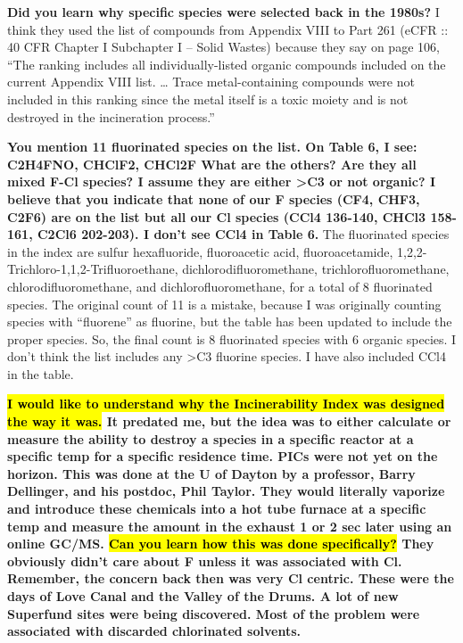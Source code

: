 \documentclass{article}
\begin{document}
\textbf{Did you learn why specific species were selected back in the 1980s?}
I think they used the list of compounds from Appendix VIII to Part 261 (eCFR :: 40 CFR Chapter I Subchapter I -- Solid Wastes) because they say on page 106, “The ranking includes all individually-listed organic compounds included on the current Appendix VIII list. … Trace metal-containing compounds were not included in this ranking since the metal itself is a toxic moiety and is not destroyed in the incineration process.”

\textbf{You mention 11 fluorinated species on the list.  On Table 6, I see: C2H4FNO, CHClF2, CHCl2F
What are the others? Are they all mixed F-Cl species?  I assume they are either >C3 or not organic?  I believe that you indicate that none of our F species (CF4, CHF3, C2F6) are on the list but all our Cl species (CCl4 136-140, CHCl3 158-161, C2Cl6 202-203).  I don’t see CCl4 in Table 6.}
The fluorinated species in the index are sulfur hexafluoride, fluoroacetic acid, fluoroacetamide, 1,2,2-Trichloro-1,1,2-Trifluoroethane, dichlorodifluoromethane, trichlorofluoromethane, chlorodifluoromethane, and dichlorofluoromethane, for a total of 8 fluorinated species. The original count of 11 is a mistake, because I was originally counting species with “fluorene” as fluorine, but the table has been updated to include the proper species. So, the final count is 8 fluorinated species with 6 organic species. I don’t think the list includes any >C3 fluorine species. I have also included CCl4 in the table.

 

\textbf{\hl{I would like to understand why the Incinerability Index was designed the way it was.}  It predated me, but the idea was to either calculate or measure the ability to destroy a species in a specific reactor at a specific temp for a specific residence time.  PICs were not yet on the horizon.  This was done at the U of Dayton by a professor, Barry Dellinger, and his postdoc, Phil Taylor.  They would literally vaporize and introduce these chemicals into a hot tube furnace at a specific temp and measure the amount in the exhaust 1 or 2 sec later using an online GC/MS.  \hl{Can you learn how this was done specifically?}  They obviously didn’t care about F unless it was associated with Cl.  Remember, the concern back then was very Cl centric.  These were the days of Love Canal and the Valley of the Drums.  A lot of new Superfund sites were being discovered.  Most of the problem were associated with discarded chlorinated solvents.}
\end{document}

